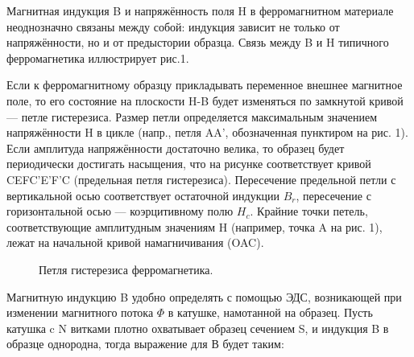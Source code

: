 \documentclass[a4paper, 12pt]{article}%
\begin{document}
	Магнитная индукция B и напряжённость поля H в ферромагнитном материале неоднозначно связаны между собой: индукция зависит
	не только от напряжённости, но и от предыстории образца. Связь между B и H типичного ферромагнетика иллюстрирует рис.1.
	
	Если к ферромагнитному образцу прикладывать переменное внешнее
	магнитное поле, то его состояние на плоскости H-B будет изменяться
	по замкнутой кривой — петле гистерезиса. Размер петли определяется
	максимальным значением напряжённости H в цикле (напр., петля AA',
	обозначенная пунктиром на рис. 1). Если амплитуда напряжённости достаточно велика, то образец будет периодически достигать насыщения,
	что на рисунке соответствует кривой CEFC'E'F'C (предельная петля
	гистерезиса). Пересечение предельной петли с вертикальной осью соответствует остаточной индукции $B_r$, пересечение с горизонтальной осью — коэрцитивному полю $H_c$. Крайние точки петель, соответствующие амплитудным значениям H (например, точка A на рис. 1), лежат на начальной кривой намагничивания (OAC).
	
	
	\begin{figure}[h]
		\caption{Петля гистерезиса ферромагнетика.}
	\end{figure}
	
	\newpage
	
	Магнитную индукцию B удобно
	определять с помощью ЭДС, возникающей при изменении магнитного
	потока $\Phi$ в катушке, намотанной на образец. Пусть катушка c N витками плотно охватывает образец сечением S, и индукция B в образце
	однородна, тогда выражение для В будет таким:
	
\end{document}
